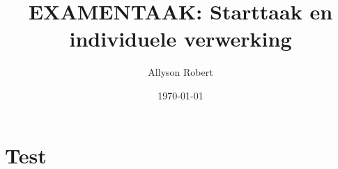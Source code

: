 \documentclass{uhreport}
\title{EXAMENTAAK: Starttaak en individuele verwerking}
\author{Allyson Robert}
\date{\today}
\begin{document}
\maketitle
\tableofcontents
\thispagestyle{toc}
\cleardoublepage


\section{Test}
\lipsum
\lipsum
\lipsum
\lipsum
\end{document}
